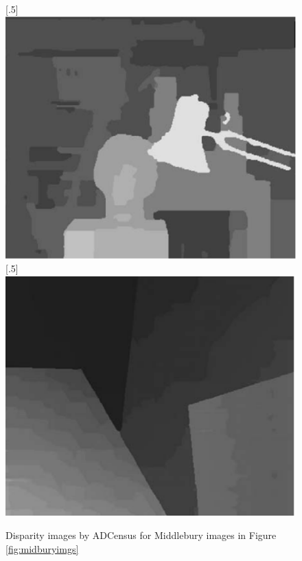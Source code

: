 \begin{figure}[H]
\centering
{}
[.5\linewidth]{\includegraphics[scale=0.5]{adctsukuba}}%
[.5\linewidth]{\includegraphics[scale=0.51]{adcvenus}}%
\caption{Disparity images by ADCensus for Middlebury images in Figure \protect\ref{fig:midburyimgs}}
\label{fig:adcmidbury}
\end{figure}

